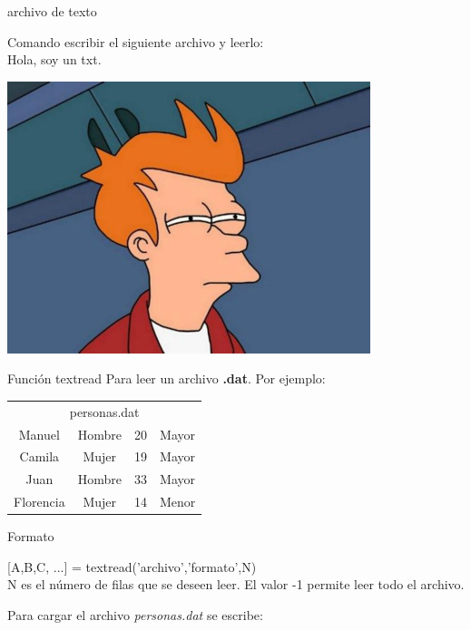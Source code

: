 \documentclass{bredelebeamer}
\begin{document}
\begin{frame}{archivo de texto}
\begin{exampleblock}{Comando}
escribir el siguiente archivo y leerlo:\\
Hola, soy un txt.
\end{exampleblock}
\begin{center}
\includegraphics[scale=0.6]{images/Fry}
\end{center}

\end{frame}
\begin{frame}{Función textread}
Para leer un archivo \textbf{.dat}. Por ejemplo:
\begin{table}[]
\centering
\begin{tabular}{cccc}
\multicolumn{4}{c}{personas.dat} \\
Manuel     & Hombre & 20 & Mayor \\
Camila     & Mujer  & 19 & Mayor \\
Juan       & Hombre & 33 & Mayor \\
Florencia  & Mujer  & 14 & Menor
\end{tabular}
\end{table}
\begin{block}{Formato}
\begin{center}
[A,B,C, ...] = textread(’archivo’,’formato’,N)\\
N es el número de filas que se deseen leer. El valor -1 permite leer todo el archivo.
\end{center}
\end{block}
Para cargar el archivo \textit{personas.dat} se escribe:\\
\begin{center}

\end{center}
\end{frame}
\end{document}
